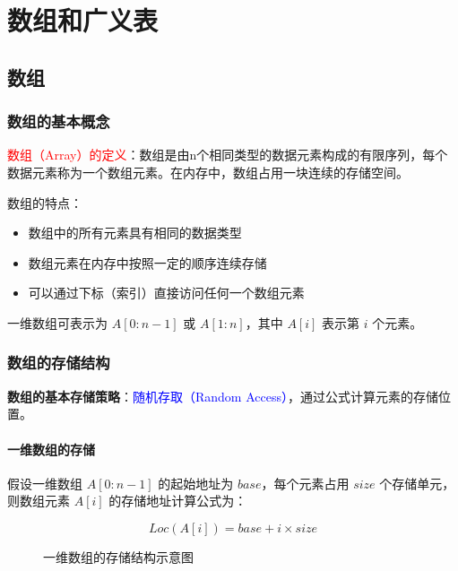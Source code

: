 \documentclass{../../note}
\begin{document}
\section{数组和广义表}

\subsection{数组}

\subsubsection{数组的基本概念}

\textcolor{red}{数组（Array）的定义}：数组是由n个相同类型的数据元素构成的有限序列，每个数据元素称为一个数组元素。在内存中，数组占用一块连续的存储空间。

数组的特点：
\begin{itemize}
  \item 数组中的所有元素具有相同的数据类型
  \item 数组元素在内存中按照一定的顺序连续存储
  \item 可以通过下标（索引）直接访问任何一个数组元素
\end{itemize}

一维数组可表示为 $A[0:n-1]$ 或 $A[1:n]$，其中 $A[i]$ 表示第 $i$ 个元素。

\subsubsection{数组的存储结构}

\textbf{数组的基本存储策略}：\textcolor{blue}{随机存取（Random Access）}，通过公式计算元素的存储位置。

\paragraph{一维数组的存储}

假设一维数组 $A[0:n-1]$ 的起始地址为 $base$，每个元素占用 $size$ 个存储单元，则数组元素 $A[i]$ 的存储地址计算公式为：

\begin{equation}
  Loc(A[i]) = base + i \times size
\end{equation}

\begin{figure}[h]
  \centering
  \caption{一维数组的存储结构示意图}
\end{figure}
\end{document}
